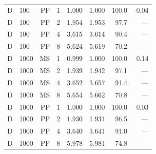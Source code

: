 \begin{longtable}{@{}llrrrrrr@{}}
D & 100 & PP & 1 & 1.000 & 1.000 & 100.0 & -0.04\\
D & 100 & PP & 2 & 1.954 & 1.953 & 97.7 & ---\\
D & 100 & PP & 4 & 3.615 & 3.614 & 90.4 & ---\\
D & 100 & PP & 8 & 5.624 & 5.619 & 70.2 & ---\\
D & 1000 & MS & 1 & 0.999 & 1.000 & 100.0 & 0.14\\
D & 1000 & MS & 2 & 1.939 & 1.942 & 97.1 & ---\\
D & 1000 & MS & 4 & 3.652 & 3.657 & 91.4 & ---\\
D & 1000 & MS & 8 & 5.654 & 5.662 & 70.8 & ---\\
D & 1000 & PP & 1 & 1.000 & 1.000 & 100.0 & 0.03\\
D & 1000 & PP & 2 & 1.930 & 1.931 & 96.5 & ---\\
D & 1000 & PP & 4 & 3.640 & 3.641 & 91.0 & ---\\
D & 1000 & PP & 8 & 5.978 & 5.981 & 74.8 & ---\\
\end{longtable}\normalsize
